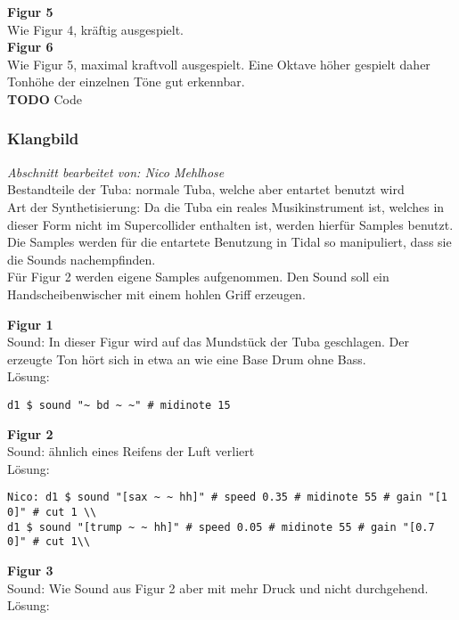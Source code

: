 \documentclass[
10pt, %
a4paper, %
oneside, %
headinclude,footinclude, %
BCOR5mm, %
]{scrartcl}
\begin{document}
\noindent\textbf{Figur 5}\\
Wie Figur 4, kräftig ausgespielt.\\

\noindent\textbf{Figur 6}\\
Wie Figur 5, maximal kraftvoll ausgespielt. Eine Oktave höher gespielt daher Tonhöhe der einzelnen Töne gut erkennbar.\\
{\color{red}\textbf{TODO}} Code

\subsubsection{Klangbild}
\textit{Abschnitt bearbeitet von: Nico Mehlhose}\\

\noindent Bestandteile der Tuba: normale Tuba, welche aber entartet benutzt wird\\
Art der Synthetisierung: Da die Tuba ein reales Musikinstrument ist, welches in dieser Form nicht im Supercollider enthalten ist,
werden hierfür Samples benutzt. Die Samples werden für die entartete Benutzung in Tidal so manipuliert, dass sie die Sounds
nachempfinden.\\
Für Figur 2 werden eigene Samples aufgenommen. Den Sound soll ein Handscheibenwischer mit einem hohlen Griff erzeugen.

\noindent\textbf{Figur 1}\\
 Sound: In dieser Figur wird auf das Mundstück der Tuba geschlagen. Der erzeugte Ton hört sich in etwa an wie eine Base Drum ohne Bass.\\
Lösung:\\
\begin{lstlisting}
d1 $ sound "~ bd ~ ~" # midinote 15
\end{lstlisting}

\noindent\textbf{Figur 2}\\
Sound: ähnlich eines Reifens der Luft verliert\\
Lösung:\\
\begin{lstlisting}
Nico: d1 $ sound "[sax ~ ~ hh]" # speed 0.35 # midinote 55 # gain "[1 0]" # cut 1 \\
d1 $ sound "[trump ~ ~ hh]" # speed 0.05 # midinote 55 # gain "[0.7 0]" # cut 1\\
\end{lstlisting}

\noindent\textbf{Figur 3}\\
Sound: Wie Sound aus Figur 2 aber mit mehr Druck und nicht durchgehend.\\
Lösung:\\
\end{document}
